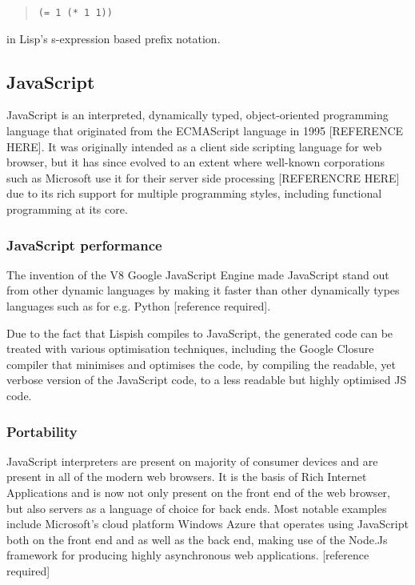 \begin{quote}
\begin{verbatim}
(= 1 (* 1 1))
\end{verbatim}
\end{quote}
in Lisp's s-expression based prefix notation.

\subsection{JavaScript}
JavaScript is an interpreted, dynamically typed, object-oriented programming language that originated from the ECMAScript language in 1995 [REFERENCE HERE]. It was originally intended as a client side scripting language for web browser, but it has since evolved to an extent where well-known corporations such as Microsoft use it for their server side processing [REFERENCRE HERE] due to its rich support for multiple programming styles, including functional programming at its core.

\subsubsection{JavaScript performance}
The invention of the V8 Google JavaScript Engine made JavaScript stand out from other dynamic languages by making it faster than other dynamically types languages such as for e.g. Python [reference required].

Due to the fact that Lispish compiles to JavaScript, the generated code can be treated with various optimisation techniques, including the Google Closure compiler that minimises and optimises the code, by compiling the readable, yet verbose version of the JavaScript code, to a less readable but highly optimised JS code.

\subsubsection{Portability}
JavaScript interpreters are present on majority of consumer devices and are present in all of the modern web browsers. It is the basis of Rich Internet Applications and is now not only present on the front end of the web browser, but also servers as a language of choice for back ends.
Most notable examples include Microsoft's cloud platform Windows Azure that operates using JavaScript both on the front end and as well as the back end, making use of the Node.Js framework for producing highly asynchronous web applications. [reference required]

